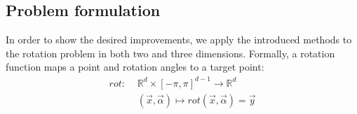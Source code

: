\subsection{Problem formulation}
In order to show the desired improvements, we apply the introduced methods to the rotation problem in both two and three dimensions. Formally, a rotation function maps a point and rotation angles to a target point:
\begin{equation}
\label{rot_fn}
\begin{aligned}
rot: \,\,&\mathbb{R}^{d} \times [- \pi, \pi] ^{d-1} \to \mathbb{R}^{d}\\
&(\vec{x}, \vec{\alpha}) \mapsto rot(\vec{x}, \vec{\alpha}) = \vec{y}
\end{aligned}
\end{equation}

